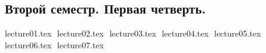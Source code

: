 \documentclass[12pt,letterpaper]{report}
\theoremstyle{definition}
\begin{document}
\newpage
\pagestyle{plain}
\fi
\tableofcontents
\newpage
\begin{normalsize}
\chapter*{Второй семестр. Первая четверть.}
{lecture01.tex}
$ $
{lecture02.tex}
$ $
{lecture03.tex}
$ $
{lecture04.tex}
$ $
{lecture05.tex}
$ $
{lecture06.tex}
$ $
{lecture07.tex}
$ $
\end{normalsize}
\end{document}
